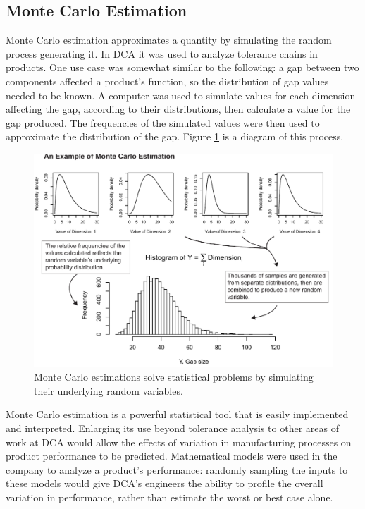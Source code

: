 \documentclass[11pt,a4paper,article]{memoir} %
\begin{document}
\subsection*{Monte Carlo Estimation}
Monte Carlo estimation approximates a quantity by simulating the random process generating it. In DCA it was used to analyze tolerance chains in products. One use case was somewhat similar to the following: a gap between two components affected a product's function, so the distribution of gap values needed to be known. A computer was used to simulate values for each dimension affecting the gap, according to their distributions, then calculate a value for the gap produced. The frequencies of the simulated values were then used to approximate the distribution of the gap. Figure \ref{fig:monte_carlo} is a diagram of this process.
\begin{figure}[h!]
\includegraphics[width=\textwidth]{MC_estimation.pdf}
\caption{Monte Carlo estimations solve statistical problems by simulating their underlying random variables.}
\label{fig:monte_carlo}
\end{figure}

Monte Carlo estimation is a powerful statistical tool that is easily implemented and interpreted. Enlarging its use beyond tolerance analysis to other areas of work at DCA would allow the effects of variation in manufacturing processes on product performance to be predicted. Mathematical models were used in the company to analyze a product's performance: randomly sampling the inputs to these models would give DCA's engineers the ability to profile the overall variation in performance, rather than estimate the worst or best case alone.
\end{document}
